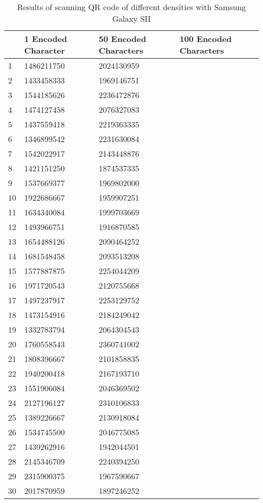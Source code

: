 	\begin{table}[ht!]
    		\caption{Results of scanning QR code of different densities with Samsung Galaxy SII} \label{tab:distamceGoogleGlassFull}
		\centering \begin{tabularx}{\textwidth}{l|X|X|X} \hline
		& \textbf{1 Encoded Character} & \textbf{50 Encoded Characters} & \textbf{100 Encoded Characters} \\ \hline \hline
       
		1&	1486211750	&	2024130959	&	\\ \hline
		2&	1433458333	&	1969146751	&	\\ \hline
		3&	1544185626	&	2236472876	&	\\ \hline
		4&	1474127458	&	2076327083	&	\\ \hline
		5&	1437559418	&	2219363335	&	\\ \hline
		6&	1346899542	&	2231630084	&	\\ \hline
		7&	1542022917	&	2143448876	&	\\ \hline
		8&	1421151250	&	1874537335	&	\\ \hline
		9&	1537669377	&	1969802000	&	\\ \hline
		10&	1922686667	&	1959907251	&	\\ \hline
		11&	1634340084	&	1999703669	&	\\ \hline
		12&	1493966751	&	1916870585	&	\\ \hline
		13&	1654488126	&	2090464252	&	\\ \hline
		14&	1681548458	&	2093513208	&	\\ \hline
		15&	1577887875	&	2254044209	&	\\ \hline
		16&	1971720543	&	2120755668	&	\\ \hline
		17&	1497237917	&	2253129752	&	\\ \hline
		18&	1473154916	&	2184249042	&	\\ \hline
		19&	1332783794	&	2064304543	&	\\ \hline
		20&	1760558543	&	2360741002	&	\\ \hline
		21&	1808396667	&	2101858835	&	\\ \hline
		22&	1940200418	&	2167193710	&	\\ \hline
		23&	1551906084	&	2046369502	&	\\ \hline
		24&	2127196127	&	2310106833	&	\\ \hline
		25&	1389226667	&	2130918084	&	\\ \hline
		26&	1534745500	&	2046775085	&	\\ \hline
		27&	1439262916	&	1942044501	&	\\ \hline
		28&	2145346709	&	2240394250	&	\\ \hline
		29&	2315900375	&	1967590667	&	\\ \hline
		30&	2017870959	&	1897246252	&	\\ \hline

		\end{tabularx}
	\end{table}
	
